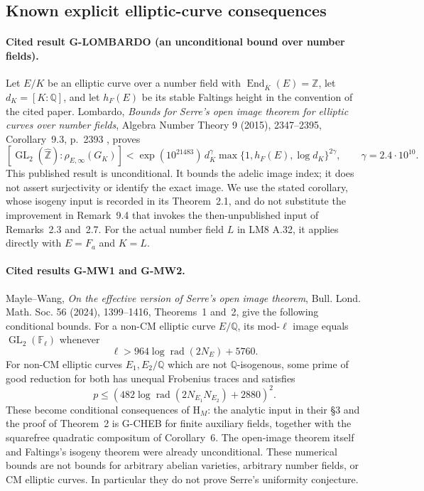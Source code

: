\subsection{Known explicit elliptic-curve consequences}

\paragraph{Cited result G-LOMBARDO (an unconditional bound over number fields).}
Let $E/K$ be an elliptic curve over a number field with
$\operatorname{End}_{\overline K}(E)=\mathbb Z$, let $d_K=[K:\mathbb Q]$,
and let $h_F(E)$ be its stable Faltings height in the convention of the
cited paper.  Lombardo, \emph{Bounds for Serre's open image theorem for
elliptic curves over number fields}, Algebra Number Theory 9 (2015),
2347--2395, Corollary~9.3, p.~2393 \cite{Lombardo2015}, proves
\[
 [\operatorname{GL}_2(\widehat{\mathbb Z}):\rho_{E,\infty}(G_K)]
 < \exp(10^{21483})\,d_K^{\gamma}
       \max\{1,h_F(E),\log d_K\}^{2\gamma},
 \qquad \gamma=2.4\cdot10^{10}. \tag{G-LOMBARDO}
\]
This published result is unconditional. It bounds the adelic image index;
it does not assert surjectivity or identify the exact image. We use the
stated corollary, whose isogeny input is recorded in its Theorem~2.1,
and do not substitute the improvement in Remark~9.4 that invokes the
then-unpublished input of Remarks~2.3 and~2.7. For the actual number
field $L$ in LM8 A.32, it applies directly with $E=F_a$ and $K=L$.

\paragraph{Cited results G-MW1 and G-MW2.}
Mayle--Wang, \emph{On the effective version of Serre's open image theorem}, Bull. Lond. Math. Soc. 56 (2024), 1399--1416, Theorems~1 and~2, give the following conditional bounds. For a non-CM elliptic curve $E/\mathbb Q$, its mod-$\ell$ image equals $\operatorname{GL}_2(\mathbb F_\ell)$ whenever
\[
 \ell>964\log\operatorname{rad}(2N_E)+5760.
 \tag{G-MW1}
\]
For non-CM elliptic curves $E_1,E_2/\mathbb Q$ which are not $\mathbb Q$-isogenous, some prime of good reduction for both has unequal Frobenius traces and satisfies
\[
 p\le\left(482\log\operatorname{rad}(2N_{E_1}N_{E_2})+2880\right)^2.
 \tag{G-MW2}
\]
These become conditional consequences of $\mathrm{H}_M$: the analytic input in their \S3 and the proof of Theorem~2 is G-CHEB for finite auxiliary fields, together with the squarefree quadratic compositum of Corollary~6. The open-image theorem itself and Faltings's isogeny theorem were already unconditional. These numerical bounds are not bounds for arbitrary abelian varieties, arbitrary number fields, or CM elliptic curves. In particular they do not prove Serre's uniformity conjecture.

